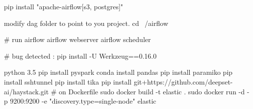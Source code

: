 pip install "apache-airflow[s3, postgres]"

modify dag folder to point to you project.
cd ~/airflow

# run airflow
airflow webserver
airflow scheduler

# bug detected :
pip install -U Werkzeug==0.16.0


python 3.5
pip install pyspark 
conda install pandas 
pip install paramiko
pip install sshtunnel
pip install tika
pip install git+https://github.com/deepset-ai/haystack.git
# on Dockerfile
sudo docker build -t elastic .
sudo docker run -d -p 9200:9200 -e "discovery.type=single-node" elastic